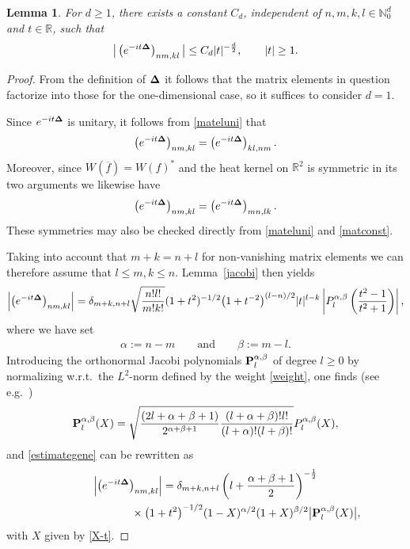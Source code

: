 \documentclass[11pt]{article}
\newtheorem{lemma}{Lemma}
\begin{document}
\begin{lemma}
\label{Uniest1}
For $d\geq 1$, there exists a constant $C_d$, independent of $n,m,k,l
\in\mathbb N_0^d$ and
$t\in\mathbb R$, such that
\begin{gather}\label{decay0}
\big|\left(e^{-it{\bf\Delta}}\right)_{nm,kl}\big| \leq  C_d |t|^{-\frac
d2} ,\qquad |t|\geq 1 .
\end{gather}
\end{lemma}

\begin{proof} From the def\/inition of ${\bf\Delta}$ it follows that the
  matrix elements in question factorize into those for the
  one-dimensional case, so it suf\/f\/ices to consider $d=1$.

 Since $e^{-it{\bf\Delta}}$ is unitary, it follows from
  \eqref{mateluni} that
 \[
\left(e^{-it{\bf\Delta}}\right)_{nm,kl} =  \left(e^{-it{\bf\Delta}}\right)_{kl,nm}.
\]
 Moreover, since
$W(\overline f)=W(f)^*$ and the heat kernel on $\mathbb R^2$ is
symmetric in its two arguments we likewise have
 \[
\left(e^{-it{\bf\Delta}}\right)_{nm,kl} =  \left(e^{-it{\bf\Delta}}\right)_{mn,lk} .
\]
These symmetries may also be checked directly from \eqref{mateluni} and \eqref{matconst}.

Taking into account that $m+k=n+l$ for non-vanishing matrix elements
we can therefore assume that $l\leq m,k\leq n$. Lemma~\ref{jacobi} then yields
\begin{gather}
\label{estimategene}
\left|\left(e^{-it{\bf\Delta}}\right)_{nm,kl}\right|
 = \delta_{m+k,n+l}
\sqrt{\frac{n! l!}{m! k!}}(1+t^2)^{-1/2}
\big(1+t^{-2}\big)^{(l-n)/2}|t|^{l-k}
\left|P_l^{\alpha,\beta}\left(\frac{t^2-1}{t^2+1}\right)\right|,
\end{gather}
where we have set
\begin{gather*}%
\alpha:=n-m \qquad\mbox{and}\qquad \beta:=m-l .
\end{gather*}
Introducing the orthonormal Jacobi polynomials ${\bf
  P}_l^{\alpha,\beta}$ of degree $l\geq 0$ by normalizing w.r.t.\ the
$L^2$-norm def\/ined by the weight \eqref{weight}, one f\/inds (see e.g.~\cite[p.~67]{Szego})
\[
{\bf P}_l^{\alpha,\beta}(X)  =  \sqrt{\frac{(2l+\alpha +\beta +1)}{2^{\alpha
    +\beta +1}}\frac{(l+\alpha +\beta)! l!}{(l+\alpha)! (l+\beta)!}}
P_l^{\alpha,\beta}(X) ,
\]
and \eqref{estimategene} can be rewritten as
\begin{gather}
\left|\left(e^{-it{\bf\Delta}}\right)_{nm,kl}\right|
 = \delta_{m+k,n+l}\left(l+\frac{\alpha +\beta +1}2\right)^{-\frac 12}\nonumber\\
 \hphantom{\left|\left(e^{-it{\bf\Delta}}\right)_{nm,kl}\right|=}{}\times
\big(1+t^2\big)^{-1/2} (1-X)^{\alpha/2}(1+X)^{\beta/2}
\big|{\bf P}_l^{\alpha,\beta}(X)\big| ,\label{estimategene2}
\end{gather}
with $X$ given by \eqref{X-t}.


\end{proof}
\end{document}

